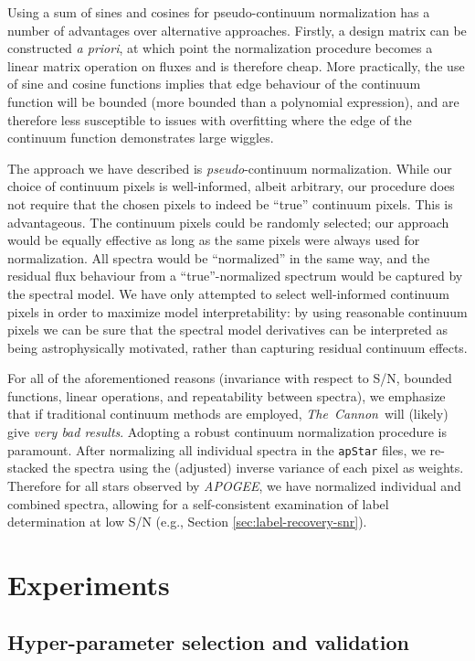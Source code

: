 \documentclass[12pt,preprint]{aastex}
\newcommand{\project}[1]{\textsl{#1}}
\newcommand{\TheCannon}{\project{The~Cannon}}
\newcommand{\acronym}[1]{{\small{#1}}}
\newcommand{\apogee}{\project{\acronym{APOGEE}}}
\begin{document}
Using a sum of sines and cosines for pseudo-continuum normalization has a number
of advantages over alternative approaches.  Firstly, a design matrix can be
constructed \emph{a priori}, at which point the normalization procedure becomes a
linear matrix operation on fluxes and is therefore cheap.  More practically, 
the use of sine and cosine functions implies that edge behaviour of the 
continuum function will be bounded (more bounded than a polynomial expression),
and are therefore less susceptible to issues with overfitting where the edge of
the continuum function demonstrates large wiggles.


The approach we have described is \emph{pseudo}-continuum normalization.  While 
our choice of continuum pixels is well-informed, albeit arbitrary, our 
procedure does not require that the chosen pixels to indeed be ``true'' continuum
pixels.  This is advantageous.  The continuum pixels could be randomly selected; 
our approach would be equally effective as long as the same pixels were always
used for normalization.  All spectra would be ``normalized'' in the same way, and
the residual flux behaviour from a ``true''-normalized spectrum would be captured 
by the spectral model.  We have only attempted to select well-informed continuum
pixels in order to maximize model interpretability: by using reasonable 
continuum pixels we can be sure that the spectral model derivatives can be 
interpreted as being astrophysically motivated, rather than capturing residual 
continuum effects.


For all of the aforementioned reasons (invariance with respect to S/N, bounded
functions, linear operations, and repeatability between spectra), we emphasize
that if traditional continuum methods are employed, \TheCannon\ will (likely) 
give \emph{very bad results}.  Adopting a robust continuum normalization 
procedure is paramount.  After normalizing all individual spectra in the
\texttt{apStar} files, we re-stacked the spectra using the (adjusted) inverse
variance of each pixel as weights.  Therefore for all stars observed by \apogee,
we have normalized individual and combined spectra, allowing for a 
self-consistent examination of label determination at low S/N (e.g., Section
\ref{sec:label-recovery-snr}).


\section{Experiments}
\label{sec:experiments}


\subsection{Hyper-parameter selection and validation}
\label{sec:hyper-parameter-validation}
\end{document}
